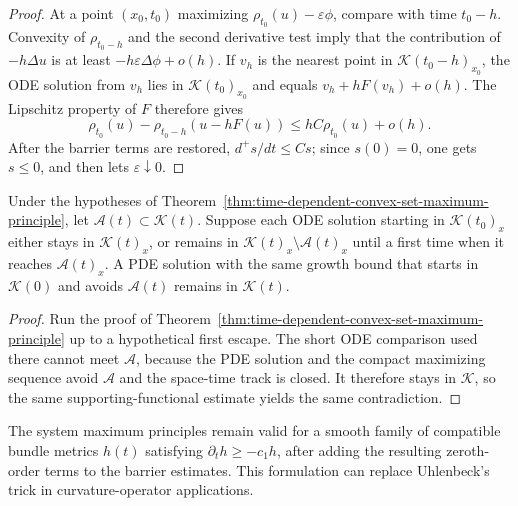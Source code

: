 \begin{proof}
At a point $(x_0,t_0)$ maximizing
$\rho_{t_0}(u)-\varepsilon\phi$, compare with time $t_0-h$.  Convexity of
$\rho_{t_0-h}$ and the second derivative test imply that the contribution of
$-h\Delta u$ is at least $-h\varepsilon\Delta\phi+o(h)$.  If $v_h$ is the
nearest point in $\mathcal K(t_0-h)_{x_0}$, the ODE solution from $v_h$ lies
in $\mathcal K(t_0)_{x_0}$ and equals $v_h+hF(v_h)+o(h)$.  The Lipschitz
property of $F$ therefore gives
\[
\rho_{t_0}(u)-\rho_{t_0-h}(u-hF(u))
\leq hC\rho_{t_0}(u)+o(h).
\]
After the barrier terms are restored, $d^+s/dt\leq Cs$; since $s(0)=0$, one
gets $s\leq0$, and then lets $\varepsilon\downarrow0$.
\end{proof}

\begin{theorem}
\label{thm:noncompact-system-avoidance-set-maximum-principle}
Under the hypotheses of
Theorem~\ref{thm:time-dependent-convex-set-maximum-principle}, let
$\mathcal A(t)\subset\mathcal K(t)$.  Suppose each ODE solution starting in
$\mathcal K(t_0)_x$ either stays in $\mathcal K(t)_x$, or remains in
$\mathcal K(t)_x\setminus\mathcal A(t)_x$ until a first time when it reaches
$\mathcal A(t)_x$.  A PDE solution with the same growth bound that starts in
$\mathcal K(0)$ and avoids $\mathcal A(t)$ remains in $\mathcal K(t)$.
\end{theorem}

\begin{proof}
Run the proof of
Theorem~\ref{thm:time-dependent-convex-set-maximum-principle} up to a
hypothetical first escape.  The short ODE comparison used there cannot meet
$\mathcal A$, because the PDE solution and the compact maximizing sequence
avoid $\mathcal A$ and the space-time track is closed.  It therefore stays in
$\mathcal K$, so the same supporting-functional estimate yields the same
contradiction.
\end{proof}

\begin{remark}
\label{rem:maximum-principles-time-dependent-bundle-metric}
The system maximum principles remain valid for a smooth family of compatible
bundle metrics $h(t)$ satisfying $\partial_th\geq-c_1h$, after adding the
resulting zeroth-order terms to the barrier estimates.  This formulation can
replace Uhlenbeck's trick in curvature-operator applications.
\end{remark}

